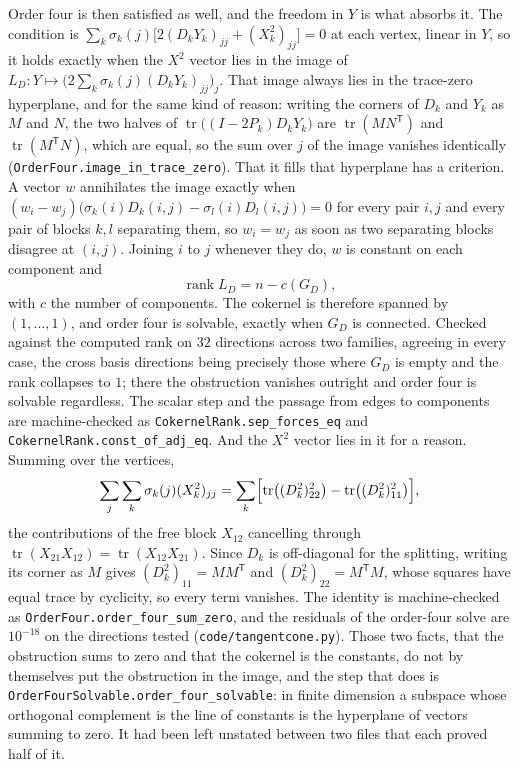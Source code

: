 \documentclass[11pt]{article}
\theoremstyle{remark}
\begin{document}
Order four is then satisfied as well, and the freedom in $Y$ is what absorbs it. The condition is
$\sum_k\sigma_k(j)\bigl[2(D_kY_k)_{jj}+(X_k^2)_{jj}\bigr]=0$ at each vertex, linear in $Y$, so it
holds exactly when the $X^2$ vector lies in the image of $L_D:Y\mapsto
\bigl(2\sum_k\sigma_k(j)(D_kY_k)_{jj}\bigr)_j$. That image always lies in the trace-zero hyperplane, and for the same
kind of reason: writing the corners of $D_k$ and $Y_k$ as $M$ and $N$, the two halves of
$\operatorname{tr}\bigl((I-2P_k)D_kY_k\bigr)$ are $\operatorname{tr}(MN^{\mathsf T})$ and
$\operatorname{tr}(M^{\mathsf T}N)$, which are equal, so the sum over $j$ of the image vanishes
identically (\texttt{OrderFour.image\_in\_trace\_zero}). That it fills that hyperplane has a criterion. A vector $w$
annihilates the image exactly when $(w_i-w_j)\bigl(\sigma_k(i)D_k(i,j)-\sigma_l(i)D_l(i,j)\bigr)=0$
for every pair $i,j$ and every pair of blocks $k,l$ separating them, so $w_i=w_j$ as soon as two
separating blocks disagree at $(i,j)$. Joining $i$ to $j$ whenever they do, $w$ is constant on each
component and
\[
\operatorname{rank}L_D=n-c(G_D),
\]
with $c$ the number of components. The cokernel is therefore spanned by $(1,\dots,1)$, and order
four is solvable, exactly when $G_D$ is connected. Checked against the computed rank on $32$
directions across two families, agreeing in every case, the cross basis directions being precisely
those where $G_D$ is empty and the rank collapses to $1$; there the obstruction vanishes outright
and order four is solvable regardless. The scalar step and the passage from edges to components are
machine-checked as \texttt{CokernelRank.sep\_forces\_eq} and
\texttt{CokernelRank.const\_of\_adj\_eq}. And the
$X^2$ vector lies in it for a reason. Summing over the vertices,
\[
\sum_j\sum_k\sigma_k(j)(X_k^2)_{jj}
=\sum_k\Bigl[\operatorname{tr}\bigl((D_k^2)_{22}^2\bigr)-\operatorname{tr}\bigl((D_k^2)_{11}^2\bigr)\Bigr],
\]
the contributions of the free block $X_{12}$ cancelling through
$\operatorname{tr}(X_{21}X_{12})=\operatorname{tr}(X_{12}X_{21})$. Since $D_k$ is off-diagonal for
the splitting, writing its corner as $M$ gives $(D_k^2)_{11}=MM^{\mathsf T}$ and
$(D_k^2)_{22}=M^{\mathsf T}M$, whose squares have equal trace by cyclicity, so every term vanishes.
The identity is machine-checked as \texttt{OrderFour.order\_four\_sum\_zero}, and the residuals of
the order-four solve are $10^{-18}$ on the directions tested (\texttt{code/tangentcone.py}). Those
two facts, that the obstruction sums to zero and that the cokernel is the constants, do not by
themselves put the obstruction in the image, and the step that does is
\texttt{OrderFourSolvable.order\_four\_solvable}: in finite dimension a subspace whose orthogonal
complement is the line of constants is the hyperplane of vectors summing to zero. It had been left
unstated between two files that each proved half of it.
\end{document}
